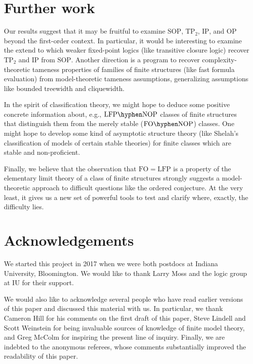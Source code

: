 \documentclass{lmcs}
\newcommand{\LFP}{\mathrm{LFP}}
\newcommand{\FO}{\mathrm{FO}}
\newcommand{\FOP}[1]{\FO\hyphen#1}
\newcommand{\LFPP}[1]{\LFP\hyphen#1}
\newcommand{\OP}{\mathrm{OP}}
\newcommand{\NOP}{\mathrm{NOP}}
\newcommand{\IP}{\mathrm{IP}}
\newcommand{\SOP}{\mathrm{SOP}}
\newcommand{\TPT}{\mathrm{TP}_2}
\theoremstyle{thmC}
\begin{document}
\section{Further work}
Our results suggest that it may be fruitful to examine $\SOP$, $\TPT$, $\IP$, and $\OP$ beyond the first-order context. In particular, it would be interesting to examine the extend to which weaker fixed-point logics (like transitive closure logic) recover $\TPT$ and $\IP$ from $\SOP$. Another direction is a program to recover complexity-theoretic tameness properties of families of finite structures (like fast formula evaluation) from model-theoretic tameness assumptions, generalizing  assumptions like bounded treewidth and cliquewidth.

In the spirit of classification theory, we might hope to deduce some positive concrete information about, e.g., $\LFPP{\NOP}$ classes of finite structures that distinguish them from the merely stable ($\FOP{\NOP}$) classes. One might hope to develop some kind of asymptotic structure theory (like Shelah's classification of models of certain stable theories) for finite classes which are stable and non-proficient.

Finally, we believe that the observation that $\FO = \LFP$ is a property of the elementary limit theory of a class of finite structures strongly suggests a model-theoretic approach to difficult questions like the ordered conjecture. At the very least, it gives us a new set of powerful tools to test and clarify where, exactly, the difficulty lies.

\section*{Acknowledgements}

We started this project in 2017 when we were both postdocs at Indiana University, Bloomington. We would like to thank Larry Moss and the logic group at IU for their support.

We would also like to acknowledge several people who have read earlier versions of this paper and discussed this material with us. In particular, we thank Cameron Hill for his comments on the first
draft of this paper, Steve Lindell and Scott
Weinstein for being invaluable sources of knowledge of finite model theory, and Greg McColm for inspiring the present line of inquiry. Finally, we are indebted to the anonymous referees, whose comments substantially improved the readability of this paper.



\end{document}
